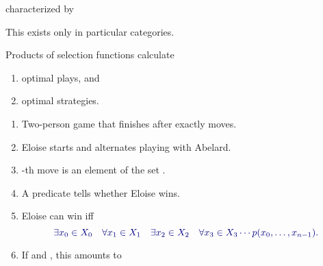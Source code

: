 \documentclass%
[%
Screen4to3,
]{foils}
\begin{document}
\vfill

characterized by


\qquad \qquad {}

\vfill

 This exists only in particular categories.



Products of selection functions calculate
\begin{enumerate}
\item[\grey{1.}] optimal plays, and
\item[\grey{2.}] optimal strategies.
\end{enumerate}


\begin{enumerate}
\item 
Two-person game that finishes after exactly  moves.

\item 
Eloise starts and alternates playing with Abelard. 

\item {}-th move is an element of the set .

\item A predicate  tells whether Eloise wins.

\item  Eloise can
  win iff
\[
\darkblue{\exists x_0 \in X_0 \quad \forall x_1 \in X_1 \quad \exists x_{2} \in X_{2} \quad \forall x_{3} \in X_{3} \cdots p(x_0, \ldots, x_{n-1}).}
\]

\item 
If  and ,
this amounts to
\end{enumerate}

\end{document}
